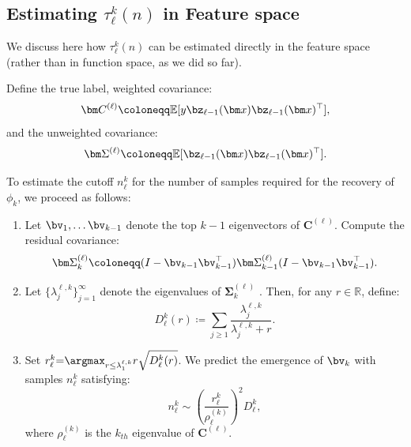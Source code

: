 \subsection{Estimating \texorpdfstring{$\tau^k_\ell(n)$}{tau-l-k(n)} in Feature space}
We discuss here how $\tau^k_\ell(n)$ can be estimated directly in the feature space (rather than in function space, as we did so far). 

Define the true label, weighted covariance:
\begin{equation}
    \bm C^{(\ell)}
    \coloneqq
    \mathbb{E}[
    y 
    \bz_{\ell-1}(\bm x)
    {\bz}_{\ell-1}(\bm x)^\top] ,
\end{equation}
and the unweighted covariance:
\begin{equation}
    \bm \Sigma^{(\ell)}
    \coloneqq
    \mathbb{E}[
    \bz_{\ell-1}(\bm x)
    {\bz}_{\ell-1}(\bm x)^\top].
\end{equation}

To estimate the cutoff $n^k_\ell$ for the number of samples required for the recovery of $\phi_k$, we proceed as follows:
\begin{enumerate}
    \item Let $\bv_1,\dots \bv_{k-1}$ denote the top $k-1$ eigenvectors of $\bm C^{(\ell)}$. Compute the residual covariance:
    \begin{equation}
        \bm\Sigma^{(\ell)}_k \coloneqq (I-\bv_{k-1}\bv_{k-1}^\top) \bm\Sigma^{(\ell)}_{k-1}(I-\bv_{k-1}\bv_{k-1}^\top).
    \end{equation}

    \item Let $\{\lambda^{\ell,k}_j\}_{j=1}^\infty$ denote the eigenvalues of $\bm\Sigma^{(\ell)}_k$ . Then, for any $r \in \mathbb{R}$, define:
    \begin{equation}
       D^k_{\ell}(r) \coloneqq \sum_{j\geq 1} \frac{\lambda^{\ell,k}_j}{\lambda^{\ell,k}_j+r}.
    \end{equation}
    
    \item Set $r^k_\ell{=}\argmax_{r \leq \lambda_1^{\ell,k}} r \sqrt{D^k_{\ell}(r)}$.
    We predict the emergence of $\bv_{k}$ with samples $n^k_{\ell}$ satisfying:
    \begin{equation}\label{2605:eq:real-data-emergence-estimate}
        n^k_{\ell} \sim  \left(\frac{r^k_\ell}{\rho^{(k)}_\ell}\right)^2 D^k_{\ell},
    \end{equation}
    where $\rho^{(k)}_\ell$ is the $k_{th}$ eigenvalue of $\bm C^{(\ell)}$.
\end{enumerate}



